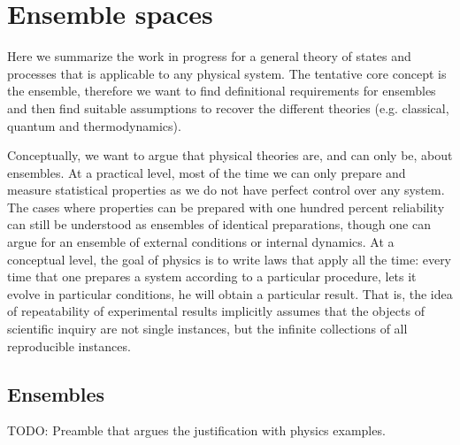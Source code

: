 
\def\>{\rangle}
\def\<{\langle}

\newcommand\mix{\mathrm{mix}}
\newcommand\component{\mathrm{comp}}
\newcommand\cospan{\mathrm{cospan}}
\newcommand\dist{\mathrm{dist}}
\newcommand\hull{\mathrm{hull}}
\newcommand\support{\mathrm{supp}}

\newcommand\vspan{\mathrm{span}}
\newcommand\cl{\mathrm{cl}}

\def\distinct{\perp}
\def\disjunct{\upmodels}

\newcommand{\ens}[1][e] {\mathsf{#1}} %
\newcommand{\Ens}[1][E] {\mathcal{#1}} %

\chapter{Ensemble spaces}

Here we summarize the work in progress for a general theory of states and processes that is applicable to any physical system. The tentative core concept is the ensemble, therefore we want to find definitional requirements for ensembles and then find suitable assumptions to recover the different theories (e.g. classical, quantum and thermodynamics).

 Conceptually, we want to argue that physical theories are, and can only be, about ensembles. At a practical level, most of the time we can only prepare and measure statistical properties as we do not have perfect control over any system. The cases where properties can be prepared with one hundred percent reliability can still be understood as ensembles of identical preparations, though one can argue for an ensemble of external conditions or internal dynamics. At a conceptual level, the goal of physics is to write laws that apply all the time: every time that one prepares a system according to a particular procedure, lets it evolve in particular conditions, he will obtain a particular result. That is, the idea of repeatability of experimental results implicitly assumes that the objects of scientific inquiry are not single instances, but the infinite collections of all reproducible instances.

\section{Ensembles}

TODO: Preamble that argues the justification with physics examples.

